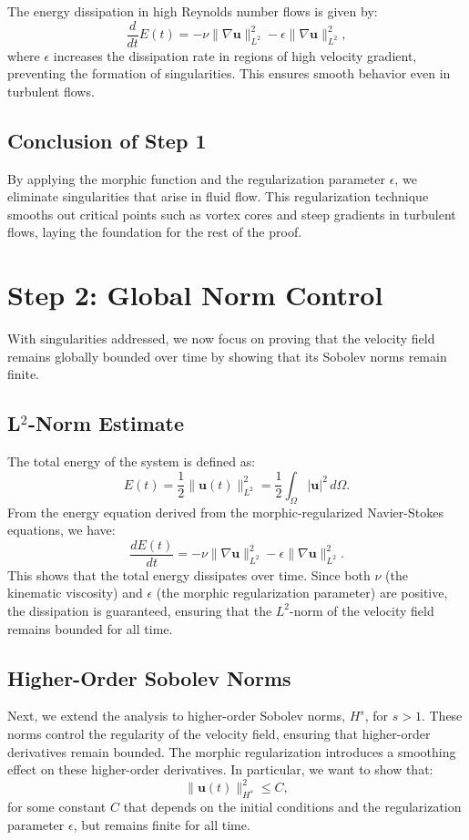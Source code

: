 \documentclass{article}
\begin{document}
The energy dissipation in high Reynolds number flows is given by:
\[
\frac{d}{dt} E(t) = - \nu \|\nabla \mathbf{u}\|_{L^2}^2 - \epsilon \|\nabla \mathbf{u}\|_{L^2}^2,
\]
where \( \epsilon \) increases the dissipation rate in regions of high velocity gradient, preventing the formation of singularities. This ensures smooth behavior even in turbulent flows.

\subsection*{Conclusion of Step 1}

By applying the morphic function and the regularization parameter \( \epsilon \), we eliminate singularities that arise in fluid flow. This regularization technique smooths out critical points such as vortex cores and steep gradients in turbulent flows, laying the foundation for the rest of the proof.

\section*{Step 2: Global Norm Control}

With singularities addressed, we now focus on proving that the velocity field remains globally bounded over time by showing that its Sobolev norms remain finite.

\subsection*{L\(^2\)-Norm Estimate}

The total energy of the system is defined as:
\[
E(t) = \frac{1}{2} \|\mathbf{u}(t)\|_{L^2}^2 = \frac{1}{2} \int_{\Omega} |\mathbf{u}|^2 \, d\Omega.
\]
From the energy equation derived from the morphic-regularized Navier-Stokes equations, we have:
\[
\frac{dE(t)}{dt} = -\nu \|\nabla \mathbf{u}\|_{L^2}^2 - \epsilon \|\nabla \mathbf{u}\|_{L^2}^2.
\]
This shows that the total energy dissipates over time. Since both \( \nu \) (the kinematic viscosity) and \( \epsilon \) (the morphic regularization parameter) are positive, the dissipation is guaranteed, ensuring that the \( L^2 \)-norm of the velocity field remains bounded for all time.

\subsection*{Higher-Order Sobolev Norms}

Next, we extend the analysis to higher-order Sobolev norms, \( H^s \), for \( s > 1 \). These norms control the regularity of the velocity field, ensuring that higher-order derivatives remain bounded. The morphic regularization introduces a smoothing effect on these higher-order derivatives. In particular, we want to show that:
\[
\|\mathbf{u}(t)\|_{H^s}^2 \leq C,
\]
for some constant \( C \) that depends on the initial conditions and the regularization parameter \( \epsilon \), but remains finite for all time. 
\end{document}
